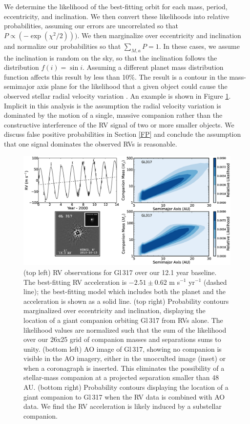 We determine the likelihood of the best-fitting orbit for each mass, period, eccentricity, and inclination. We then convert these likelihoods into relative probabilities, assuming our errors are uncorrelated so that $P \propto(-\exp(\chi^2/2)))$. We then marginalize over eccentricity and inclination and normalize our probabilities so that $\displaystyle\sum\limits_{M,a} P = 1$. In these cases, we assume the inclination is random on the sky, so that the inclination follows the distribution $f(i) = \sin i$. Assuming a different planet mass distribution function affects this result by less than 10\%. The result is a contour in the mass-semimajor axis plane for the likelihood that a given object could cause the observed stellar radial velocity variation \citep{Wright07}. An example is shown in Figure \ref{WrightRV}. Implicit in this analysis is the assumption the radial velocity variation is dominated by the motion of a single, massive companion rather than the constructive interference of the RV signal of two or more smaller objects. We discuss false positive probabilities in Section \ref{FP} and conclude the assumption that one signal dominates the observed RVs is reasonable.

\begin{figure}[htbp]
\centerline{\includegraphics[width=1.0\textwidth, trim={0 0 0 0}, clip=true ]{chapter3/f6.eps}}
\caption[RVs for Gl\,317 and parameter space where a distant companion could reside before and after AO imaging]{(top left) RV observations for Gl\,317 over our 12.1 year baseline. The best-fitting RV acceleration is $-2.51 \pm 0.62$ m s$^{-1}$ yr$^{-1}$ (dashed line); the best-fitting model which includes both the planet and the acceleration is shown as a solid line. (top right) Probability contours marginalized over eccentricity and inclination, displaying the location of a giant companion orbiting Gl\,317 from RVs alone. The likelihood values are normalized such that the sum of the likelihood over our 26x25 grid of companion masses and separations sums to unity. (bottom left) AO image of Gl\,317, showing no companion is visible in the AO imagery, either in the unocculted image (inset) or when a coronagraph is inserted. This eliminates the possibility of a stellar-mass companion at a projected separation smaller than 48 AU. (bottom right) Probability contours displaying the location of a giant companion to Gl\,317 when the RV data is combined with AO data. We find the RV acceleration is likely induced by a substellar companion.
  }
\label{WrightRV}
\end{figure}


